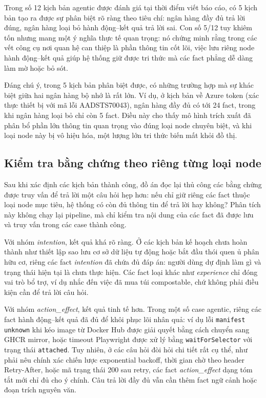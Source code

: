 \documentclass[../main.tex]{subfiles}
\begin{document}
Trong số 12 kịch bản agentic được đánh giá tại thời điểm viết báo cáo, có 5 kịch bản tạo ra được sự phân biệt rõ ràng theo tiêu chí: ngân hàng đầy đủ trả lời đúng, ngân hàng loại bỏ hành động--kết quả trả lời sai. Con số 5/12 tuy khiêm tốn nhưng mang một ý nghĩa thực tế quan trọng: nó chứng minh rằng trong các vết công cụ nơi quan hệ can thiệp là phần thông tin cốt lõi, việc lưu riêng node hành động--kết quả giúp hệ thống giữ được tri thức mà các fact phẳng dễ dàng làm mờ hoặc bỏ sót. 

Đáng chú ý, trong 5 kịch bản phân biệt được, có những trường hợp mà sự khác biệt giữa hai ngân hàng bộ nhớ là rất lớn. Ví dụ, ở kịch bản về Azure token (xác thực thiết bị với mã lỗi AADSTS70043), ngân hàng đầy đủ có tới 24 fact, trong khi ngân hàng loại bỏ chỉ còn 5 fact. Điều này cho thấy mô hình trích xuất đã phân bổ phần lớn thông tin quan trọng vào đúng loại node chuyên biệt, và khi loại node này bị vô hiệu hóa, một lượng lớn tri thức biến mất khỏi đồ thị.

\subsection{Kiểm tra bằng chứng theo riêng từng loại node}

Sau khi xác định các kịch bản thành công, đồ án đọc lại thủ công các bằng chứng được truy vấn để trả lời một câu hỏi hẹp hơn: nếu chỉ giữ riêng các fact thuộc loại node mục tiêu, hệ thống có còn đủ thông tin để trả lời hay không? Phân tích này không chạy lại pipeline, mà chỉ kiểm tra nội dung của các fact đã được lưu và truy vấn trong các case thành công.

Với nhóm \textit{intention}, kết quả khá rõ ràng. Ở các kịch bản kế hoạch chưa hoàn thành như thiết lập sao lưu cơ sở dữ liệu tự động hoặc bắt đầu thói quen ủ phân hữu cơ, riêng các fact \textit{intention} đã chứa đủ đáp án: người dùng dự định làm gì và trạng thái hiện tại là chưa thực hiện. Các fact loại khác như \textit{experience} chỉ đóng vai trò bổ trợ, ví dụ nhắc đến việc đã mua túi compostable, chứ không phải điều kiện cần để trả lời câu hỏi.

Với nhóm \textit{action\_effect}, kết quả tinh tế hơn. Trong một số case agentic, riêng các fact hành động--kết quả đã đủ để khôi phục lõi nhân quả: ví dụ lỗi \texttt{manifest unknown} khi kéo image từ Docker Hub được giải quyết bằng cách chuyển sang GHCR mirror, hoặc timeout Playwright được xử lý bằng \texttt{waitForSelector} với trạng thái \texttt{attached}. Tuy nhiên, ở các câu hỏi đòi hỏi chi tiết rất cụ thể, như phải nêu chính xác chiến lược exponential backoff, thời gian chờ theo header Retry-After, hoặc mã trạng thái 200 sau retry, các fact \textit{action\_effect} dạng tóm tắt mới chỉ đủ cho ý chính. Câu trả lời đầy đủ vẫn cần thêm fact ngữ cảnh hoặc đoạn trích nguyên văn.
\end{document}
